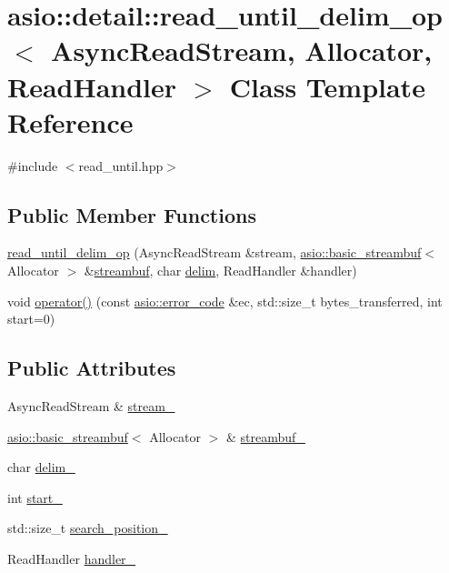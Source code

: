 \hypertarget{classasio_1_1detail_1_1read__until__delim__op}{}\section{asio\+:\+:detail\+:\+:read\+\_\+until\+\_\+delim\+\_\+op$<$ Async\+Read\+Stream, Allocator, Read\+Handler $>$ Class Template Reference}
\label{classasio_1_1detail_1_1read__until__delim__op}


{\ttfamily \#include $<$read\+\_\+until.\+hpp$>$}

\subsection*{Public Member Functions}
\begin{DoxyCompactItemize}
\item 
\hyperlink{classasio_1_1detail_1_1read__until__delim__op_a4b963caf32ddf424c0d5efea820acb1f}{read\+\_\+until\+\_\+delim\+\_\+op} (Async\+Read\+Stream \&stream, \hyperlink{classasio_1_1basic__streambuf}{asio\+::basic\+\_\+streambuf}$<$ Allocator $>$ \&\hyperlink{namespaceasio_a6a7ba348943527312eeace3492bf32ee}{streambuf}, char \hyperlink{group__async__read__until_gafbf62a75ad736aff941c1f70d4b3c223}{delim}, Read\+Handler \&handler)
\item 
void \hyperlink{classasio_1_1detail_1_1read__until__delim__op_ab1ba3faf6916391cd68a7d684b48ff4d}{operator()} (const \hyperlink{classasio_1_1error__code}{asio\+::error\+\_\+code} \&ec, std\+::size\+\_\+t bytes\+\_\+transferred, int start=0)
\end{DoxyCompactItemize}
\subsection*{Public Attributes}
\begin{DoxyCompactItemize}
\item 
Async\+Read\+Stream \& \hyperlink{classasio_1_1detail_1_1read__until__delim__op_a1bb807733f7f03ea6eb5956c251eea4a}{stream\+\_\+}
\item 
\hyperlink{classasio_1_1basic__streambuf}{asio\+::basic\+\_\+streambuf}$<$ Allocator $>$ \& \hyperlink{classasio_1_1detail_1_1read__until__delim__op_abdf7bd4e2142014b91065a9150d8f366}{streambuf\+\_\+}
\item 
char \hyperlink{classasio_1_1detail_1_1read__until__delim__op_a1759626e41e1848f782aac357b54c3f6}{delim\+\_\+}
\item 
int \hyperlink{classasio_1_1detail_1_1read__until__delim__op_a75f7ed240fb758a37f0893150aea7fd1}{start\+\_\+}
\item 
std\+::size\+\_\+t \hyperlink{classasio_1_1detail_1_1read__until__delim__op_aecea70ef337b9f61459c1671618aed95}{search\+\_\+position\+\_\+}
\item 
Read\+Handler \hyperlink{classasio_1_1detail_1_1read__until__delim__op_a4adc13e1e6271a6f531363401e515b54}{handler\+\_\+}
\end{DoxyCompactItemize}


